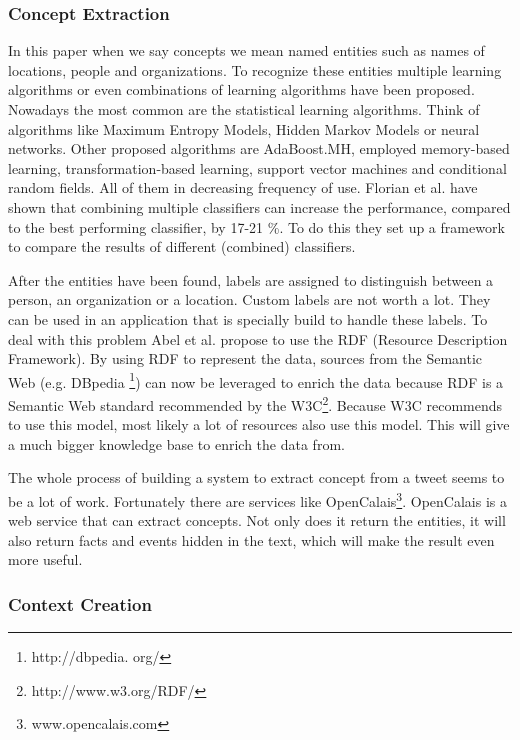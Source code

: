 \documentclass{article}
\begin{document}
\subsubsection*{Concept Extraction}

In this paper when we say concepts we mean named entities such as names of locations, people and organizations. To recognize these entities multiple learning algorithms or even combinations of learning algorithms have been proposed. Nowadays the most common are the statistical learning algorithms. Think of algorithms like Maximum Entropy Models, Hidden Markov Models or neural networks. Other proposed algorithms are AdaBoost.MH, employed memory-based learning, transformation-based learning, support vector machines and conditional random fields. All of them in decreasing frequency of use.\cite{EntityRecognition} Florian et al. have shown that combining multiple classifiers can increase the performance, compared to the best performing classifier, by 17-21 \%.\cite{ClassifierCombination} To do this they set up a framework to compare the results of different (combined) classifiers.  

After the entities have been found, labels are assigned to distinguish between a person, an organization or a location. Custom labels are not worth a lot. They can be used in an application that is specially build to handle these labels. To deal with this problem Abel et al. propose to use the RDF (Resource Description Framework).\cite{AdaptiveSearch} By using RDF to represent the data, sources from the Semantic Web (e.g. DBpedia \footnote{http://dbpedia.
org/}) can now be leveraged to enrich the data because RDF is a Semantic Web standard recommended by the W3C\footnote{http://www.w3.org/RDF/}. Because W3C recommends to use this model, most likely a lot of resources also use this model. This will give a much bigger knowledge base to enrich the data from.

The whole process of building a system to extract concept from a tweet seems to be a lot of work. Fortunately there are services like OpenCalais\footnote{www.opencalais.com}. OpenCalais is a web service that can extract concepts. Not only does it return the entities, it will also return facts and events hidden in the text, which will make the result even more useful.

\subsubsection*{Context Creation}
\end{document}
